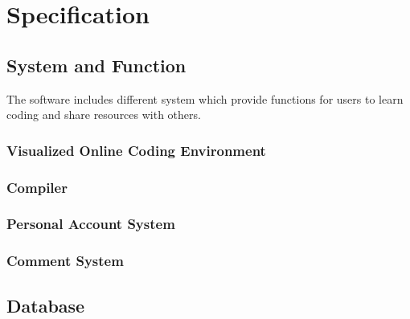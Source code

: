 \chapter{Specification}
\section{System and Function}
The software includes different system which provide functions for users to learn coding and share resources with others.
\subsection{Visualized Online Coding Environment}
	
\subsection{Compiler}
\subsection{Personal Account System}
	
\subsection{Comment System}
\section{Database}
